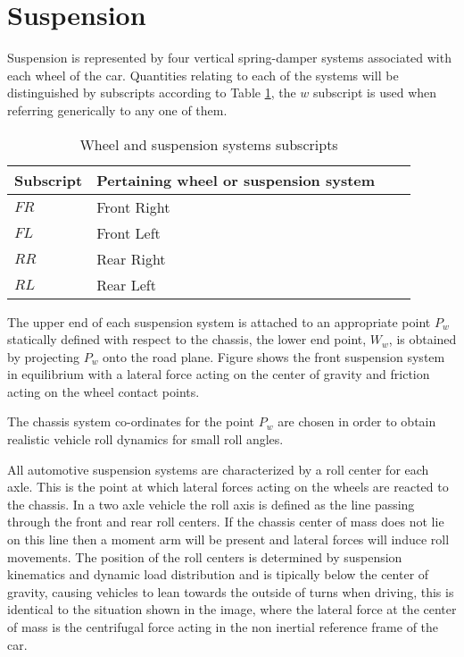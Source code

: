 

\section{Suspension}
\label{sec:suspension}
Suspension is represented by four vertical spring-damper systems associated with each wheel of the car. Quantities relating to each of the systems will be distinguished by subscripts according to Table \ref{table:subscripts}, the $w$ subscript is used when referring generically to any one of them.

\begin{table}[ht]
\caption{Wheel and suspension systems subscripts} %
\centering %
\begin{tabular}{l l l l} %
\hline\hline %
Subscript & Pertaining wheel or suspension system \\ [0.5ex] %
\hline %
$FR$ & Front Right \\ %
$FL$ & Front Left \\
$RR$ & Rear Right \\
$RL$ & Rear Left \\ [1ex] %
\hline %
\end{tabular}
\label{table:subscripts} %
\end{table}

The upper end of each suspension system is attached to an appropriate point $P_w$ statically defined with respect to the chassis, the lower end point, $W_w$, is obtained by projecting $P_w$ onto the road plane.
Figure  shows the front suspension system in equilibrium with a lateral force acting on the center of gravity and friction acting on the wheel contact points.

The chassis system co-ordinates for the point $P_w$ are chosen in order to obtain realistic vehicle roll dynamics for small roll angles.

All automotive suspension systems are characterized by a roll center for each axle. This is the point at which lateral forces acting on the wheels are reacted to the chassis.
In a two axle vehicle the roll axis is defined as the line passing through the front and rear roll centers. If the chassis center of mass does not lie on this line then a moment arm will be present and lateral forces will induce roll movements.
The position of the roll centers is determined by suspension kinematics and dynamic load distribution and is tipically below the center of gravity, causing vehicles to lean towards the outside of turns when driving, this is identical to the situation shown in the  image, where the lateral force at the center of mass is the centrifugal force acting in the non inertial reference frame of the car.

